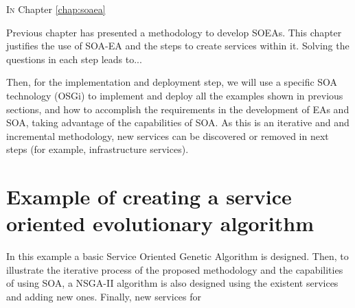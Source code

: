 \label{chap:osgiliath}


\minitoc\mtcskip
\vfill
\lettrine{I}{n} Chapter \ref{chap:soaea} %

Previous chapter has presented a methodology to develop SOEAs. This chapter justifies the use of SOA-EA and the steps to create services within it. Solving the questions in each step leads to...

Then, for the implementation and deployment step, we will use a specific SOA technology (OSGi) to implement and deploy all the examples shown in previous sections, and how to accomplish the requirements in the development of EAs and SOA, taking advantage of the capabilities of SOA. As this is an iterative and and incremental methodology, new services can be discovered or removed in next steps (for example, infrastructure services).

\section{Example of creating a service oriented evolutionary algorithm}
\label{sec:soaea:creating}
 
In this example a basic Service Oriented Genetic Algorithm is designed. Then, to illustrate the iterative process of the proposed methodology and the capabilities of using SOA, a NSGA-II algorithm is also designed using the existent services and adding new ones. Finally, new services for 

